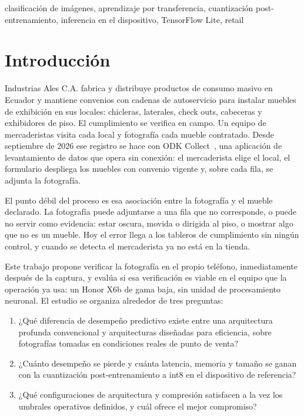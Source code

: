 \documentclass[conference]{IEEEtran}
\begin{document}
\begin{IEEEkeywords}
clasificación de imágenes, aprendizaje por transferencia, cuantización post-entrenamiento, inferencia en el
dispositivo, TensorFlow Lite, retail
\end{IEEEkeywords}

\section{Introducción}

Industrias Ales C.A. fabrica y distribuye productos de consumo masivo en Ecuador y mantiene convenios con cadenas de
autoservicio para instalar muebles de exhibición en sus locales: chicleras, laterales, check outs, cabeceras y
exhibidores de piso. El cumplimiento se verifica en campo. Un equipo de mercaderistas visita cada local y fotografía
cada mueble contratado. Desde septiembre de 2026 ese registro se hace con ODK Collect~\cite{hartung2010odk}, una
aplicación de levantamiento de datos que opera sin conexión: el mercaderista elige el local, el formulario despliega
los muebles con convenio vigente y, sobre cada fila, se adjunta la fotografía.

El punto débil del proceso es esa asociación entre la fotografía y el mueble declarado. La fotografía puede
adjuntarse a una fila que no corresponde, o puede no servir como evidencia: estar oscura, movida o dirigida al piso,
o mostrar algo que no es un mueble. Hoy el error llega a los tableros de cumplimiento sin ningún control, y cuando
se detecta el mercaderista ya no está en la tienda.

Este trabajo propone verificar la fotografía en el propio teléfono, inmediatamente después de la captura, y evalúa
si esa verificación es viable en el equipo que la operación ya usa: un Honor X6b de gama baja, sin unidad de
procesamiento neuronal. El estudio se organiza alrededor de tres preguntas:

\begin{enumerate}
\item ¿Qué diferencia de desempeño predictivo existe entre una arquitectura profunda convencional y arquitecturas
diseñadas para eficiencia, sobre fotografías tomadas en condiciones reales de punto de venta?
\item ¿Cuánto desempeño se pierde y cuánta latencia, memoria y tamaño se ganan con la cuantización
post-entrenamiento a int8 en el dispositivo de referencia?
\item ¿Qué configuraciones de arquitectura y compresión satisfacen a la vez los umbrales operativos definidos, y
cuál ofrece el mejor compromiso?
\end{enumerate}
\end{document}
